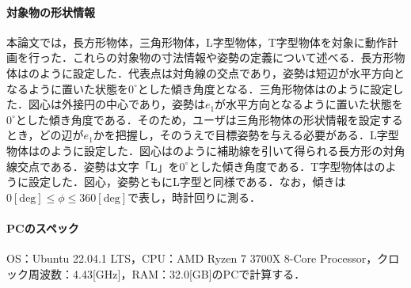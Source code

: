 \documentclass[a4paper,twoside,12pt,papersize, dvipdfmx]{iirthesis}
\begin{document}
\paragraph{対象物の形状情報}
本論文では，長方形物体，三角形物体，L字型物体，T字型物体を対象に動作計画を行った．これらの対象物の寸法情報や姿勢の定義について述べる．長方形物体はのように設定した．代表点は対角線の交点であり，姿勢は短辺が水平方向となるように置いた状態を$0^\circ$とした傾き角度となる．三角形物体はのように設定した．図心は外接円の中心であり，姿勢は$e_1$が水平方向となるように置いた状態を$0^\circ$とした傾き角度である．そのため，ユーザは三角形物体の形状情報を設定するとき，どの辺が$e_1$かを把握し，そのうえで目標姿勢を与える必要がある．L字型物体は\figref{}のように設定した．図心はのように補助線を引いて得られる長方形の対角線交点である．姿勢は文字「L」を$0^\circ$とした傾き角度である．T字型物体はのように設定した．図心，姿勢ともにL字型と同様である．なお，傾きは$0 \mathrm{[deg]} \leq \phi \leq 360 \mathrm{[deg]}$で表し，時計回りに測る．

\paragraph{PCのスペック}
OS：Ubuntu 22.04.1 LTS，CPU：AMD Ryzen 7 3700X 8-Core Processor，クロック周波数：4.43[GHz]，RAM：32.0[GB]のPCで計算する．
\end{document}
